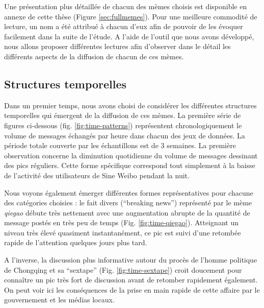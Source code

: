 Une présentation plus détaillée de chacun des mèmes choisis est disponible en annexe de cette thèse (Figure \ref{sec:fullmemes}). Pour une meilleure commodité de lecture, un nom a été attribué \`a chacun d'eux afin de pouvoir de les évoquer facilement dans la suite de l'étude. A l'aide de l'outil que nous avons développé, nous allons proposer différentes lectures afin d'observer dans le détail les différents aspects de la diffusion de chacun de ces mèmes. 

\newpage

\subsection[Structures temporelles]{Structures temporelles}

Dans un premier temps, nous avons choisi de considérer les différentes structures temporelles qui émergent de la diffusion de ces mèmes. La première série de figures ci-dessous (fig. \ref{fig:time-patterns}) représentent chronologiquement le volume de messages échangés par heure dans chacun des jeux de données. La période totale couverte par les échantillons est de 3 semaines. La première observation concerne la diminution quotidienne du volume de messages dessinant des pics réguliers. Cette forme spécifique correspond tout simplement \`a la baisse de l{\textquoteright}activité des utilisateurs de Sine Weibo pendant la nuit.

Nous voyons également émerger différentes formes représentatives pour chacune des catégories choisies : le fait divers ({\textquotedblleft}breaking news{\textquotedblright}) représenté par le mème \textit{qiegao} débute très nettement avec une augmentation abrupte de la quantité de message postés en très peu de temps (Fig. \ref{fig:time-qiegao}). Atteignant un niveau très élevé quasiment instantanément, ce pic est suivi d{\textquoteright}une retombée rapide de l{\textquoteright}attention quelques jours plus tard.  

A l'inverse, la discussion plus informative autour du procès de l{\textquoteright}homme politique de Chongqing et sa {\textquotedblleft}sextape{\textquotedblright} (Fig. \ref{fig:time-sextape}) croit doucement pour conna\^itre un pic très fort de discussion avant de retomber rapidement également. On peut voir ici les conséquences de la prise en main rapide de cette affaire par le gouvernement et les médias locaux. 

